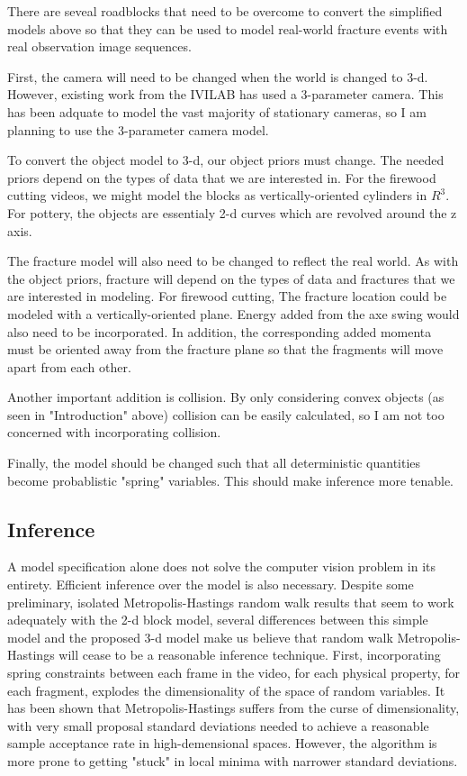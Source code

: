 \documentclass[10pt,twocolumn,letterpaper]{article}
\begin{document}
There are seveal roadblocks that need to be overcome to convert the simplified 
models above so that they can be used to model real-world fracture events with 
real observation image sequences.

First, the camera will need to be changed when the world is changed to 3-d. 
However, existing work from the IVILAB has used a 3-parameter 
camera.\cite{Brau_2013_ICCV} This has been adquate to model the vast majority of stationary cameras,
so I am planning to use the 3-parameter camera model.

To convert the object model to 3-d, our object priors must change. The needed 
priors depend on the types of data that we are interested in. For the firewood 
cutting videos, we might model the blocks as vertically-oriented cylinders in 
$R^3$. For pottery, the objects are essentialy 2-d curves which are revolved 
around the z axis.

The fracture model will also need to be changed to reflect the real world. As with 
the object priors, fracture will depend on the types of data and fractures 
that we are interested in modeling. For firewood 
cutting, The fracture location could be modeled with a vertically-oriented 
plane. Energy added from the axe swing would also need to be incorporated. 
In addition, the corresponding added momenta must be oriented away from the 
fracture plane so that the fragments will move apart from each other.

Another important addition is collision. By only considering convex objects 
(as seen in "Introduction" above) collision can be easily calculated, so I am 
not too concerned with incorporating collision.

Finally, the model should be changed such that all deterministic quantities 
become probablistic "spring" variables. This should make inference more tenable.

\subsection{Inference}

A model specification alone does not solve the computer vision problem in its 
entirety. Efficient inference over the model is also necessary. Despite some 
preliminary, isolated Metropolis-Hastings random walk results that seem to work 
adequately with the 2-d block model, several 
differences between this simple model and the proposed 3-d model make us 
believe that random walk Metropolis-Hastings will cease to be a reasonable inference 
technique. First, incorporating spring constraints between each frame in the 
video, for each physical property, for each fragment, explodes the 
dimensionality of the space of random variables. It has been shown that 
Metropolis-Hastings suffers from the curse of dimensionality, with very small 
proposal standard deviations needed to achieve a reasonable sample acceptance rate 
in high-demensional spaces.\cite{Neal2011MCMCUH} However, the algorithm is 
more prone to getting "stuck" in local minima with narrower standard deviations.
\end{document}
